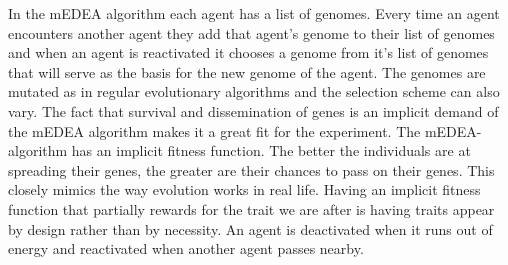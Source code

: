 \documentclass[a4paper]{book}
\begin{document}
In the mEDEA algorithm each agent has a list of genomes. 
Every time an agent encounters another agent they add that agent's genome to their list of genomes and when an agent is reactivated it chooses a genome from it's list of genomes that will serve as the basis for the new genome of the agent. 
The genomes are mutated as in regular evolutionary algorithms and the selection scheme can also vary. 
The fact that survival and dissemination of genes is an implicit demand of the mEDEA algorithm makes it a great fit for the experiment. 
The mEDEA-algorithm has an implicit fitness function. 
The better the individuals are at spreading their genes, the greater are their chances to pass on their genes. 
This closely mimics the way evolution works in real life.  
Having an implicit fitness function that partially rewards for the trait we are after is having traits appear by design rather than by necessity. 
An agent is deactivated when it runs out of energy and reactivated when another agent passes nearby.
\end{document}
